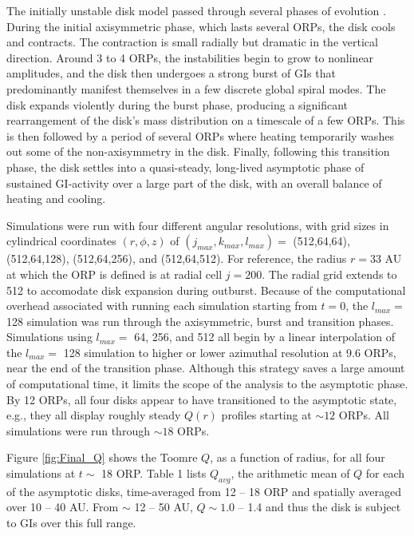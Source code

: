 \documentclass[manuscript]{aastex}
\begin{document}
The initially unstable disk model passed through several phases of evolution \citep[see also][]{pickett2003, mejia2005}.  
During the initial axisymmetric phase, 
which lasts several ORPs, the disk cools and contracts.  The contraction is small radially but dramatic in the vertical direction. Around 3 to 4 ORPs, the instabilities begin to grow to nonlinear amplitudes, and the disk 
then undergoes a strong burst of GIs that predominantly manifest themselves in a few discrete global spiral modes.  The disk expands violently during the burst phase, producing a significant rearrangement of the disk's mass distribution on a timescale of a few ORPs. This is then followed by a period of several ORPs where heating temporarily washes out some of the non-axisymmetry in the disk.  Finally, following this transition phase, the disk settles into a quasi-steady, long-lived asymptotic 
phase of sustained GI-activity over a large part of the disk, with an overall balance of heating and cooling.

Simulations were run with four different angular resolutions, with grid sizes in cylindrical coordinates $(r,\phi,z)$ of  $(j_{max}, k_{max}, l_{max}) =$ (512,64,64), (512,64,128), (512,64,256), and (512,64,512). 
For reference, the radius $r = 33$ AU at which the ORP is defined is at radial cell $j = 200$.  The radial grid extends to 512
to accomodate disk expansion during outburst.
Because of the computational overhead associated with running each simulation starting from $t = 0$, the $l_{max} =$ 128 simulation was run through the axisymmetric, burst and transition phases. Simulations using $l_{max} =$ 64, 256, and 512 all begin by a linear interpolation of the $l_{max} =$ 128 simulation to higher or lower azimuthal resolution at 9.6 ORPs, near the end of the transition
phase. Although this strategy saves a large amount of computational time, it limits the scope of the analysis to the asymptotic phase. By 12 ORPs, all four disks appear to have transitioned to the asymptotic state,
e.g., they all display roughly steady $Q(r)$ profiles starting at $\sim 12$ ORPs.  All simulations were 
run through $\sim 18$ ORPs.

Figure \ref{fig:Final_Q} shows the Toomre $Q$, as a function of radius, for all four simulations at $t \sim$ 18 ORP.  
Table 1 lists $Q_{avg}$, the arithmetic mean of $Q$ for each of the asymptotic disks, time-averaged from 12 -- 18 ORP and spatially averaged over 10 -- 40 AU.  From $\sim$ 12 -- 50 AU, $Q \sim 1.0$ -- 1.4 and thus the disk is subject to GIs over this full range.  
\end{document}
